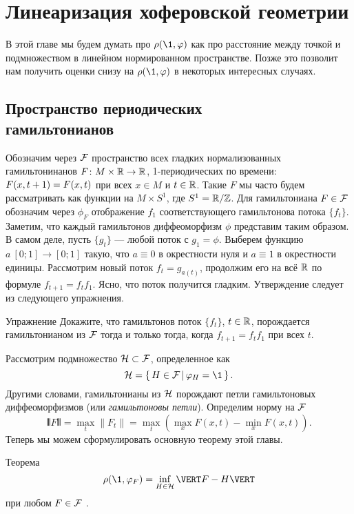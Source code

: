 \chapter{Линеаризация хоферовской геометрии}

В этой главе мы будем думать про $\rho (\1, \phi)$ как про расстояние между точкой и подмножеством в линейном нормированном пространстве.
Позже это позволит нам получить оценки снизу на $\rho (\1, \phi)$ в некоторых интересных случаях.

\section[Периодические гамильтонианы]{Пространство периодических\\гамильтонианов}

Обозначим через \index[symb]{$\F$}$\F$ пространство всех гладких нормализованных
гамильтонинанов $F\colon M \times \mathbb{R} \to \mathbb{R}$, 1-периодических по
времени: $F (x, t \z+ 1) = F (x, t)$ при всех $x \in M$ и $t\in\mathbb{R}$.
Такие $F$ мы часто будем рассматривать как функции на $M \times S^1$,
где $S^1 = \mathbb{R} / \mathbb{Z}$. 
Для гамильтониана $F \in \mathcal{F}$ обозначим через $\phi_F$ отображение
$f_1$ соответствующего гамильтонова потока $\{f_t\}$. 
Заметим, что каждый гамильтонов диффеоморфизм $\phi$ представим таким образом. 
В самом деле, пусть $\{g_t\}$ — любой поток с $g_1 = \phi$.
Выберем функцию $a\: [0; 1] \to [0; 1]$ такую, что $a \equiv 0$ в окрестности нуля и $a \equiv 1$ в окрестности единицы.
Рассмотрим новый поток $f_t = g_{a(t)}$, 
продолжим его на всё $\mathbb{R}$ по формуле $f_{t+1} = f_t f_1$.
Ясно, что поток получится гладким.
Утверждение следует из следующего упражнения.

\begin{ex}{Упражнение}\label{5.1.A}
Докажите, что гамильтонов поток $\{f_t\}$, $t \z\in \RR$,
порождается гамильтонианом из $\F$ тогда и только тогда, когда
$f_{t+1} = f_t f_1$ при всех $t$. 
\end{ex}

Рассмотрим подмножество \index[symb]{$\H$}$\mathcal{H} \subset \mathcal{F}$, определенное как 
\[\H = \set{H \in \F}{\phi_H = \1}.\]
Другими словами, гамильтонианы из $\H$ порождают петли гамильтоновых диффеоморфизмов (или \emph{гамильтоновы петли}).
Определим норму на $\F$ 
\[\VERT F \VERT = \max_{t} \| F_t \| = \max_{t} (\max_{x} F (x, t) -
\min_{x} F (x, t)).\]
Теперь мы можем сформулировать основную теорему этой главы.

\begin{thm}{Теорема}\label{5.1.B}
\[\rho (\1, \phi_F) = \inf_{H\in\H} \VERT F - H \VERT\]
при любом $F \in \mathcal{F}$ .
\end{thm}

